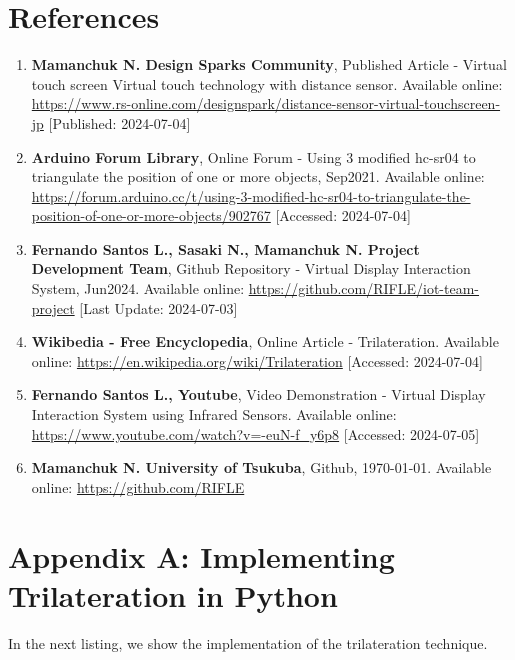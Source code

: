 \documentclass[12pt,a4paper]{article}
\begin{document}
\section*{References}
\begin{enumerate}
    \item \textbf{Mamanchuk N. Design Sparks Community}, Published Article - Virtual touch screen Virtual touch technology with distance sensor. Available online: \url{https://www.rs-online.com/designspark/distance-sensor-virtual-touchscreen-jp} [Published: 2024-07-04]
    \item \textbf{Arduino Forum Library}, Online Forum - Using 3 modified hc-sr04 to triangulate the position of one or more objects, Sep2021. Available online: \url{https://forum.arduino.cc/t/using-3-modified-hc-sr04-to-triangulate-the-position-of-one-or-more-objects/902767} [Accessed: 2024-07-04]
    \item \textbf{Fernando Santos L., Sasaki N., Mamanchuk N. Project Development Team}, Github Repository - Virtual Display Interaction System, Jun2024. Available online: \url{https://github.com/RIFLE/iot-team-project} [Last Update: 2024-07-03]
    \item \textbf{Wikibedia - Free Encyclopedia}, Online Article - Trilateration. Available online: \url{https://en.wikipedia.org/wiki/Trilateration} [Accessed: 2024-07-04]
    \item \textbf{Fernando Santos L., Youtube}, Video Demonstration - Virtual Display Interaction System using Infrared Sensors. Available online: \url{https://www.youtube.com/watch?v=-euN-f_y6p8} [Accessed: 2024-07-05]
    \item \textbf{Mamanchuk N. University of Tsukuba}, Github, \today. Available online: \url{https://github.com/RIFLE}
\end{enumerate}



\newpage
\section*{Appendix A: Implementing Trilateration in Python}
In the next listing, we show the implementation of the trilateration technique.
\end{document}
